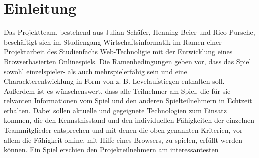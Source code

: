 

\section{Einleitung}

Das Projektteam, bestehend aus Julian Schäfer, Henning Beier und Rico Pursche, beschäftigt sich im Studiengang Wirtschaftsinformatik im Ramen einer Projektarbeit des Studienfachs Web-Technoligie mit der Entwicklung eines Browserbasierten Onlinespiels. Die Ramenbedingungen geben vor, dass das Spiel sowohl einzelspieler- als auch mehrspielerfähig sein und eine Charackterentwicklung in Form von z. B. Levelaufstiegen enthalten soll. Außerdem ist es wünschenswert, dass alle Teilnehmer am Spiel, die für sie relvanten Informationen vom Spiel und den anderen Spielteilnehmern in Echtzeit erhalten. Dabei sollen aktuelle und gegeignete Technologien zum Einsatz kommen, die den Kennstnisstand und den individuellen Fähigkeiten der einzelnen Teammitglieder entsprechen und mit denen die oben genannten Kriterien, vor allem die Fähigkeit online, mit Hilfe eines Browsers, zu spielen, erfüllt werden können. 
Ein Spiel erschien den Projekteilnehmern am interessantesten 
